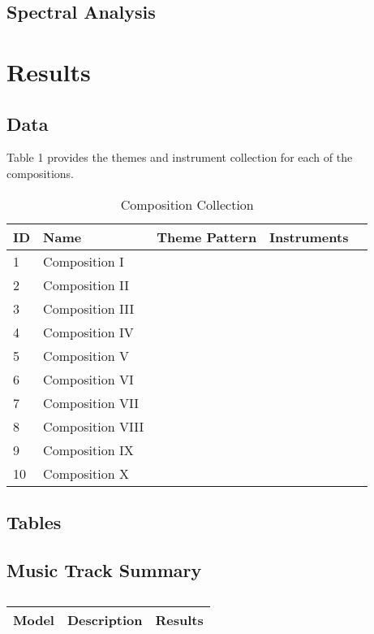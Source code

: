 \subsection{Spectral Analysis}


\section{Results}

\subsection{Data}

Table 1 provides the themes and instrument collection for each of the compositions.
	
\begin{table}[H]
\caption{Composition Collection}	
\begin{tabular}{p{1cm}p{4cm}p{2cm}p{1cm}p{1cm}}
\hline
ID & Name & Theme Pattern & Instruments & \\
\hline 
1 & Composition I &  &  & \\
2 & Composition II &  &  & \\
3 & Composition III &  & \\
4 & Composition IV & & \\
5 & Composition V & & & \\
\hline 
6 & Composition VI &  &  & \\
7 & Composition VII &  &  & \\
8 & Composition VIII &  & \\
9 & Composition IX & & \\
10 & Composition X & & & \\
\end{tabular}
\end{table}

\subsection{Tables}

\subsection{Music Track Summary}

\centering	
\begin{table}[H]\tiny
	\caption{}	
	\begin{tabular}{r|p{4cm}|l}
		\hline	
		Model & Description & Results \\
		\hline 
		\hline 
	\end{tabular}
\end{table}


